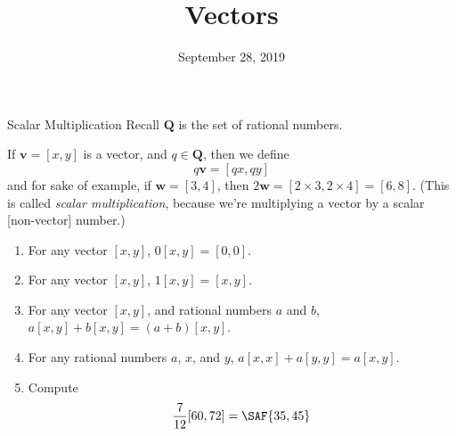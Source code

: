 \documentclass[12pt,letterpaper]{article}
\title{Vectors}
\date{September 28, 2019}
\begin{document}
\maketitle

\thispagestyle{empty}

\begin{problem}{Scalar Multiplication}
  Recall \(\mathbf{Q}\) is the set of rational numbers.

  If \(\mathbf{v} = [x, y]\) is a vector, and \(q\in\mathbf{Q}\), then we
  define \[
    q\mathbf{v} = [qx, qy]
  \] and for sake of example, if \(\mathbf{w} = [3, 4]\), then
  \(2\mathbf{w} = [2\times3, 2\times4] = [6, 8]\). (This is called \emph{scalar
  multiplication}, because we're multiplying a vector by a scalar [non-vector] number.)

  \begin{enumerate}
    \item For any vector \([x, y]\), \(0[x, y] = [0, 0]\). \hfill \TFTrue
    \item For any vector \([x, y]\), \(1[x, y] = [x, y]\). \hfill \TFTrue
    \item For any vector \([x, y]\), and rational numbers \(a\) and \(b\),
    \(a[x, y] + b[x, y] = (a+b)[x, y]\). \hfill \TFTrue
    \item For any rational numbers \(a\), \(x\), and \(y\),
    \(a[x, x] + a[y, y] = a[x, y]\). \hfill \TFFalse
    \item Compute \[
      \frac{7}{12} [60, 72] = \SAF{35, 45}
    \]
  \end{enumerate}
\end{problem}
\end{document}
